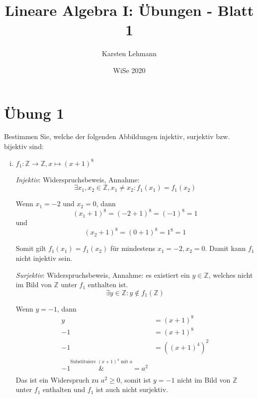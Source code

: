 \documentclass{article}
\author{Karsten Lehmann}
\date{WiSe 2020}
\title{Lineare Algebra I: Übungen - Blatt 1}
\begin{document}
\maketitle

\vfill

\newpage

\section*{Übung 1}

Bestimmen Sie, welche der folgenden Abbildungen injektiv, surjektiv bzw. bijektiv sind:

\begin{enumerate}[(i)]
\item $f_1 \colon \mathbb{Z} \to \mathbb{Z}, x \mapsto (x + 1)^8$ \\

  \emph{Injektiv}: Widerspruchsbeweis, Annahme:
  \[
    \exists x_1, x_2 \in \mathbb{Z}, x_1 \ne x_2 \colon f_1(x_1) = f_1(x_2)
  \]

  Wenn $x_1 = -2$ und $x_2 = 0$, dann
  \[
    (x_1 + 1)^8 = (-2 + 1)^8 = (-1)^8 = 1 
  \]
  und
  \[
    (x_2 + 1)^8 = (0 + 1)^8 = 1^8 = 1
  \]

  Somit gilt $f_1(x_1) = f_1(x_2)$ für mindestens $x_1 = -2, x_2 = 0$. Damit kann $f_1$ nicht injektiv sein.

  \emph{Surjektiv}: Widerspruchsbeweis, Annahme: es existiert ein $y \in \mathbb{Z}$, welches nicht im Bild von
  $\mathbb{Z}$ unter $f_1$ enthalten ist.
  \[
    \exists y \in \mathbb{Z} \colon y \notin f_1(\mathbb{Z}) 
  \]

  Wenn $y = -1$, dann
  \begin{align*}
    y  &= (x + 1)^8 \\
    -1 &= (x + 1)^8 \\
    -1 &= ((x + 1)^4)^2 \\
    -1 \overset{\text{Substituiere } (x + 1)^4 \text{ mit } a}&{=} a^2 \\
  \end{align*}
  Das ist ein Widerspruch zu $a^2 \geq 0$, somit ist $y = -1$ nicht im Bild von $\mathbb{Z}$
  unter $f_1$ enthalten und $f_1$ ist auch nicht surjektiv.


\end{enumerate}
\end{document}
